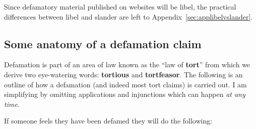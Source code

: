 \documentclass[]{article}
\begin{document}
Since defamatory material published on websites will be libel, the practical differences between libel and slander are left to Appendix~\ref{sec:applibelvslander}.

\subsection{Some anatomy of a defamation claim}

Defamation is part of an area of law known as the ``law of
\textbf{tort}{'' from which we derive two eye-watering words:
}\textbf{tortious} {and }\textbf{tortfeasor}{. The following is an
outline of how a defamation (and indeed most tort claims) is carried
out. I am simplifying by omitting applications and injunctions which can
happen }\emph{{at any time.}}

If someone feels they have been defamed they will do the following:
\end{document}
